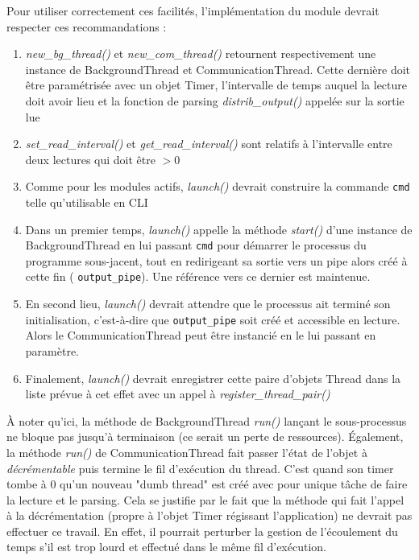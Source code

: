 \documentclass[]{article}
\begin{document}
Pour utiliser correctement ces facilités, l'implémentation du module devrait respecter ces recommandations :
\begin{enumerate}
\item \textit{new\_bg\_thread()} et \textit{new\_com\_thread()} retournent respectivement une instance de BackgroundThread et CommunicationThread. Cette dernière doit être paramétrisée avec un objet Timer, l'intervalle de temps auquel la lecture doit avoir lieu et la fonction de parsing \textit{distrib\_output()} appelée sur la sortie lue
\vspace{0.2cm}
\item \textit{set\_read\_interval()} et \textit{get\_read\_interval()} sont relatifs à l'intervalle entre deux lectures qui doit être $> 0$
\vspace{0.2cm}
\item Comme pour les modules actifs, \textit{launch()} devrait construire la commande \texttt{cmd} telle qu'utilisable en CLI
\vspace{0.2cm}
\item Dans un premier temps, \textit{launch()} appelle la méthode \textit{start()} d'une instance de BackgroundThread en lui passant \texttt{cmd} pour démarrer le processus du programme sous-jacent, tout en redirigeant sa sortie vers un pipe alors créé à cette fin ( \texttt{output\_pipe}). Une référence vers ce dernier est maintenue.
\vspace{0.2cm}
\item En second lieu, \textit{launch()} devrait attendre que le processus ait terminé son initialisation, c'est-à-dire que \texttt{output\_pipe} soit créé et accessible en lecture. Alors le CommunicationThread peut être instancié en le lui passant en paramètre.
\vspace{0.2cm}
\item Finalement, \textit{launch()} devrait enregistrer cette paire d'objets Thread dans la liste prévue à cet effet avec un appel à \textit{register\_thread\_pair()}
\end{enumerate}

\vspace{0.2cm}

À noter qu'ici, la méthode de BackgroundThread \textit{run()} lançant le sous-processus ne bloque pas jusqu'à terminaison (ce serait un perte de ressources). Également, la méthode \textit{run()} de CommunicationThread fait passer l'état de l'objet à \textit{décrémentable} puis termine le fil d'exécution du thread. C'est quand son timer tombe à 0 qu'un nouveau "dumb thread" est créé avec pour unique tâche de faire la lecture et le parsing. Cela se justifie par le fait que la méthode qui fait l'appel à la décrémentation (propre à l'objet Timer régissant l'application) ne devrait pas effectuer ce travail. En effet, il pourrait perturber la gestion de l'écoulement du temps s'il est trop lourd et effectué dans le même fil d'exécution. 
\newpage
\end{document}
